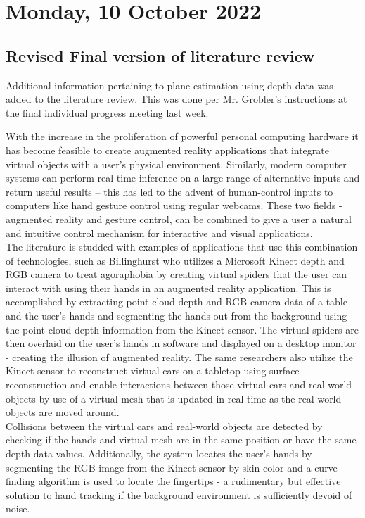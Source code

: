 \section[2022/10/10]{Monday, 10 October 2022}

\subsection{Revised Final version of literature review}

Additional information pertaining to plane estimation using depth data was added to the literature review. This was done per Mr. Grobler's instructions at the final individual progress meeting last week. 

With the increase in the proliferation of powerful personal computing hardware it has become feasible to create augmented reality applications that integrate virtual objects with a user’s physical environment. Similarly, modern computer systems can perform real-time inference on a large range of alternative inputs and return useful results – this has led to the advent of human-control inputs to computers like hand gesture control using regular webcams. These two fields - augmented reality and gesture control, can be combined to give a user a natural and intuitive control mechanism for interactive and visual applications. \\

The literature is studded with examples of applications that use this combination of technologies, such as Billinghurst \cite{Australia_spiders} who utilizes a Microsoft Kinect depth and RGB camera to treat agoraphobia by creating virtual spiders that the user can interact with using their hands in an augmented reality application. This is accomplished by extracting point cloud depth and RGB camera data of a table and the user's hands and segmenting the hands out from the background using the point cloud depth information from the Kinect sensor. The virtual spiders are then overlaid on the user's hands in software and displayed on a desktop monitor - creating the illusion of augmented reality. The same researchers also utilize the Kinect sensor to reconstruct virtual cars on a tabletop using surface reconstruction and enable interactions between those virtual cars and real-world objects by use of a virtual mesh that is updated in real-time as the real-world objects are moved around.\\

Collisions between the virtual cars and real-world objects are detected by checking if the hands and virtual mesh are in the same position or have the same depth data values. Additionally, the system locates the user's hands by segmenting the RGB image from the Kinect sensor by skin color and a curve-finding algorithm is used to locate the fingertips - a rudimentary but effective solution to hand tracking if the background environment is sufficiently devoid of noise. \\

